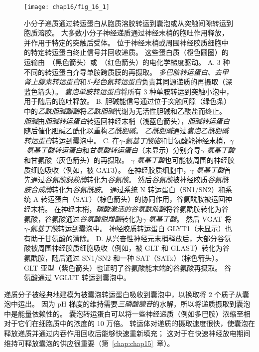 \begin{figure}[htbp]
	\centering
	\texttt{[image: chap16/fig\_16\_1]}
	\caption{小分子递质通过转运蛋白从胞质溶胶转运到囊泡或从突触间隙转运到胞质溶胶。
		大多数小分子神经递质通过神经末梢的胞吐作用释放，并作用于特定的突触后受体。
		位于神经末梢或周围神经胶质细胞中的特定转运蛋白终止信号并回收递质。
		这些蛋白质（橙色圆圈）的运输由~（黑色箭头）或~（红色箭头）的电化学梯度驱动\cite{chaudhry2008pharmacology}。
		A. 3 种不同的转运蛋白介导单胺跨质膜的再摄取。
		\textit{多巴胺转运蛋白}、\textit{去甲肾上腺素转运蛋白}和\textit{5-羟色氨转运蛋白}负责其同源递质的再摄取（深蓝色箭头）。
		\textit{囊泡单胺转运蛋白}将所有 3 种单胺转运到突触小泡中，用于随后的胞吐释放。
		B. 胆碱能信号通过位于突触间隙（绿色条）中的\textit{乙酰胆碱酯酶}将\textit{乙酰胆碱}代谢为无活性胆碱和乙酸盐而终止。
		\textit{胆碱}由\textit{胆碱转运蛋白}转运回神经末梢（浅蓝色箭头），\textit{胆碱转运蛋白}随后催化胆碱乙酰化以重构\textit{乙酰胆碱}。
		\textit{乙酰胆碱}通过\textit{囊泡乙酰胆碱转运蛋白}转运到囊泡中。
		C. 在\textit{$\gamma$-氨基丁酸能}和甘氨酸能神经末梢，\textit{$\gamma$-氨基丁酸转运蛋白}和\textit{甘氨酸转运蛋白}（未显示）分别介导\textit{$\gamma$-氨基丁酸}和甘氨酸（灰色箭头）的再摄取。
		\textit{$\gamma$-氨基丁酸}也可能被周围的神经胶质细胞吸收（例如，被 GAT3）。
		在神经胶质细胞中，\textit{$\gamma$-氨基丁酸}首先通过\textit{谷氨酸脱羧酶}转化为\textit{谷氨酸}。
		然后\textit{谷氨酸}被神经胶质\textit{谷氨酰胺合成酶}转化为\textit{谷氨酰胺}。
		通过系统 N 转运蛋白（SN1/SN2）和系统 A 转运蛋白（SAT）（棕色箭头）的协同作用，谷氨酰胺被运回神经末梢。
		在神经末梢，\textit{磷酸激活的谷氨酰胺酶}将谷氨酰胺转化为谷氨酸，谷氨酸通过\textit{谷氨酸脱羧酶}转化为\textit{$\gamma$-氨基丁酸}。
		然后 VGAT 将\textit{$\gamma$-氨基丁酸}转运到囊泡中。
		神经胶质转运蛋白 GLYT1（未显示）也有助于甘氨酸的清除。
		D. 从兴奋性神经元末梢释放后，大部分谷氨酸被周围神经胶质细胞吸收（例如，被 GLT 和 GLAST）转化为谷氨酰胺，随后通过 SN1/SN2 和一种 SAT（SATx）（棕色箭头）。
		GLT 亚型（紫色箭头）也证明了谷氨酸能末端的谷氨酸再摄取。 谷氨酸通过 VGLUT 转运到囊泡中。}
	\label{fig:16_1}
\end{figure}


递质分子被经典地建模为被囊泡转运蛋白吸收到囊泡中，以换取将 2 个质子从囊泡中运出。
因为 pH 梯度的维持需要\textit{三磷酸腺苷}的水解，所以将递质摄取到囊泡中是能量依赖性的。
囊泡转运蛋白可以将一些神经递质（例如多巴胺）浓缩至相对于它们在细胞质中的浓度的 10 万倍。
转运体对递质的摄取速度很快，使囊泡在释放递质并通过内吞作用回收后能够快速重新填充；
这对于在快速神经放电期间维持可释放囊泡的供应很重要（第~\ref{chap:chap15}~章）。


